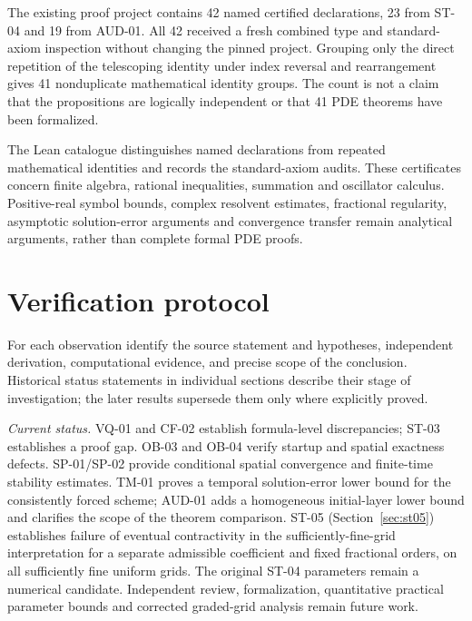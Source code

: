 \documentclass[11pt,a4paper]{amsart}
\theoremstyle{remark}
\theoremstyle{plain}
\theoremstyle{remark}
\numberwithin{equation}{section}
\begin{document}
The existing proof project contains 42 named certified declarations, 23 from ST-04 and 19 from AUD-01. All 42 received a fresh combined type and standard-axiom inspection without changing the pinned project. Grouping only the direct repetition of the telescoping identity under index reversal and rearrangement gives 41 nonduplicate mathematical identity groups. The count is not a claim that the propositions are logically independent or that 41 PDE theorems have been formalized.

The Lean catalogue distinguishes named declarations from repeated mathematical identities and records the standard-axiom audits. These certificates concern finite algebra, rational inequalities, summation and oscillator calculus. Positive-real symbol bounds, complex resolvent estimates, fractional regularity, asymptotic solution-error arguments and convergence transfer remain analytical arguments, rather than complete formal PDE proofs.

\section{Verification protocol}
\label{sec:protocol}

For each observation identify the source statement and hypotheses, independent derivation, computational evidence, and precise scope of the conclusion. Historical status statements in individual sections describe their stage of investigation; the later results supersede them only where explicitly proved.

\noindent\textit{Current status.} VQ-01 and CF-02 establish formula-level discrepancies; ST-03 establishes a proof gap. OB-03 and OB-04 verify startup and spatial exactness defects. SP-01/SP-02 provide conditional spatial convergence and finite-time stability estimates. TM-01 proves a temporal solution-error lower bound for the consistently forced scheme; AUD-01 adds a homogeneous initial-layer lower bound and clarifies the scope of the theorem comparison. ST-05 (Section~\ref{sec:st05}) establishes failure of eventual contractivity in the sufficiently-fine-grid interpretation for a separate admissible coefficient and fixed fractional orders, on all sufficiently fine uniform grids. The original ST-04 parameters remain a numerical candidate. Independent review, formalization, quantitative practical parameter bounds and corrected graded-grid analysis remain future work.
\end{document}
